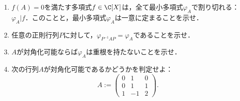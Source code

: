 \documentclass[uplatex,dvipdfmx]{jsarticle}
\begin{document}
\begin{tcolorbox}[colframe=ForestGreen, colback=ForestGreen!10!white,breakable,colbacktitle=ForestGreen!40!white,coltitle=black,fonttitle=\bfseries\sffamily,
    title=第２問]
    \begin{problem}\mbox{}
        \begin{enumerate}[{問}1]
            \item $f(A)=0$を満たす多項式$f\in\C[X]$は，全て最小多項式$\varphi_A$で割り切れる：$\varphi_A|f$．このことと，最小多項式$\varphi_A$は一意に定まることを示せ．
            \item 任意の正則行列$P$に対して，$\varphi_{P^{-1}AP}=\varphi_A$であることを示せ．
            \item $A$が対角化可能ならば$\varphi_A$は重根を持たないことを示せ．
            \item 次の行列$A$が対角化可能であるかどうかを判定せよ：
            \[A:=\begin{pmatrix}
                0&1&0\\0&1&1\\1&-1&2
            \end{pmatrix}.\]
        \end{enumerate}
    \end{problem}
\end{tcolorbox}
\end{document}
